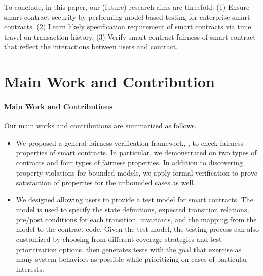 To conclude, in this paper, our (future) research aims are threefold:
(1) Ensure smart contract security by performing model based testing for enterprise smart contracts. 
(2) Learn likely specification requirement of smart contracts via time travel on transaction history. 
(3) Verify smart contract fairness of smart contract that reflect the interactions between users and contract.


\section{Main Work and Contribution}

\paragraph{Main Work and Contributions}
Our main works and contributions are summarized as follows.
\begin{itemize}[leftmargin=*,topsep=4pt]
\item We proposed a general fairness verification framework, \faircon, to check fairness properties of smart contracts.
In particular, we demonstrated \faircon on two types of contracts and four types of fairness properties.
In addition to discovering property violations for bounded models, we apply formal
verification to prove satisfaction of properties for the unbounded cases as well.

\item We designed \modcon allowing users to provide a test model for smart contracts. 
The model is used to specify the state definitions, expected transition relations, pre/post conditions for each transition, invariants, and the mapping from the model to the contract code.
Given the test model, the testing process can also customized by choosing from different coverage strategies and test prioritization options.
\modcon then generates tests with the goal that exercise as many system behaviors as possible while prioritizing on cases of particular interests.

\end{itemize}



